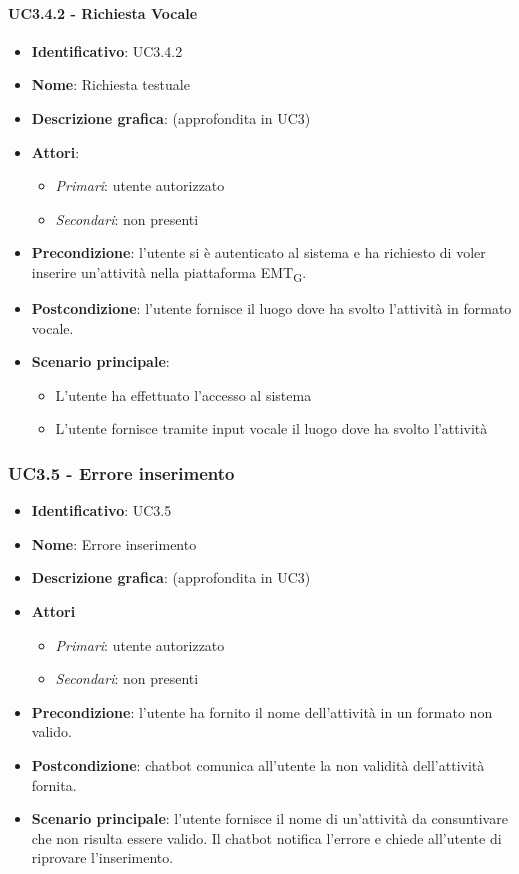 \paragraph{UC3.4.2 - Richiesta Vocale}
\begin{itemize}
   \item \textbf{Identificativo}: UC3.4.2
   \item \textbf{Nome}: Richiesta testuale
   \item \textbf{Descrizione grafica}: (approfondita in UC3)
   \item \textbf{Attori}:
   \begin{itemize} 
       \item \textit{Primari}: utente autorizzato
       \item \textit{Secondari}: non presenti
   \end{itemize}
       \item \textbf{Precondizione}: l'utente si è autenticato al sistema e ha richiesto di voler inserire un'attività nella piattaforma EMT\textsubscript{G}. 
       \item \textbf{Postcondizione}: l'utente fornisce il luogo dove ha svolto l'attività in formato vocale.
    \item \textbf{Scenario principale}: 
       \begin{itemize}
           \item L'utente ha effettuato l'accesso al sistema 
           \item L'utente fornisce tramite input vocale il luogo dove ha svolto l'attività
       \end{itemize}
\end{itemize}

\subsubsection{UC3.5 - Errore inserimento }
\begin{itemize}
    \item \textbf{Identificativo}: UC3.5
    \item \textbf{Nome}: Errore inserimento 
    \item \textbf{Descrizione grafica}: (approfondita in UC3)
    \item \textbf{Attori}
        \begin{itemize} 
            \item \textit{Primari}: utente autorizzato
            \item \textit{Secondari}: non presenti
        \end{itemize}
    \item \textbf{Precondizione}: l'utente ha fornito il nome dell'attività in un formato non valido. 
    \item \textbf{Postcondizione}: chatbot comunica all'utente la non validità dell'attività fornita.
    \item \textbf{Scenario principale}: l'utente fornisce il nome di un'attività da consuntivare che non risulta essere valido. Il chatbot notifica l'errore e chiede all'utente di riprovare l'inserimento. 
\end{itemize}

